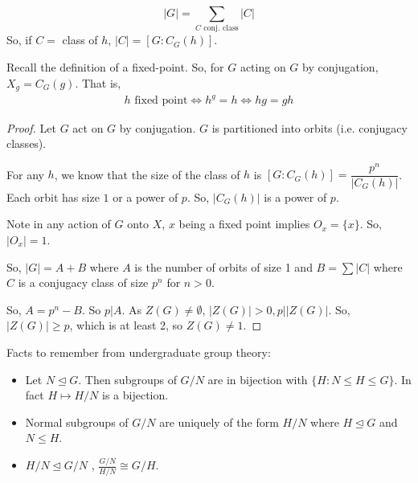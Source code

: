 \documentclass{report}
\begin{document}

$$|G| = \sum_{C \text{ conj. class} }|C|$$
So, if $C = $ class of $h$, $|C| = [G : C_G(h)]$.

Recall the definition of a fixed-point. So, for $G$ acting on $G$ by conjugation, $X_g = C_G(g)$. That is,
\begin{align*}
    h \text{ fixed point} \iff h^g = h \iff hg = gh \tag{for all $g$}
\end{align*}
\begin{proof}
    Let $G$ act on $G$ by conjugation. $G$ is partitioned into orbits (i.e. conjugacy classes). 

    For any $h$, we know that the size of the class of $h$ is $[G : C_G(h)]= \dfrac{p^n}{|C_G(h)|}$. Each orbit has size $1$ or a power of $p$. So, $|C_G(h)|$ is a power of $p$.

    Note in any action of $G$ onto $X$, $x$ being a fixed point implies $O_x = \{x\}$. So, $|O_x| = 1$.

    So, $|G| = A + B$ where $A$ is the number of orbits of size 1 and $B = \sum |C|$ where $C$ is a conjugacy class of size $p^n$ for $n > 0$. 

    So, $A = p^n - B$. So $p | A$. As $Z(G) \neq \emptyset$, $|Z(G)| > 0, p | |Z(G)|$. So, $|Z(G)| \geq p$, which is at least 2, so $Z(G) \neq 1$.
\end{proof}

Facts to remember from undergraduate group theory:
\begin{itemize}
    \item Let $N \trianglelefteq G$. Then subgroups of $G/N$ are in bijection with $\{H : N \leq H \leq G\}$. In fact $H \mapsto H/N$ is a bijection.
    \item Normal subgroups of $G/N$ are uniquely of the form $H/N$ where $H \trianglelefteq G$ and $N \leq H$.
    \item $H/N \trianglelefteq G/N$ , $\frac{G/N}{H/N} \cong G/H$.
\end{itemize}
\newpage
\end{document}
